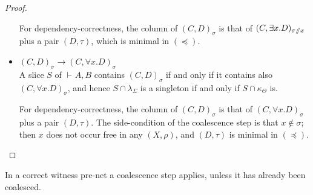\documentclass[UKenglish]{lipics-v2016}
\theoremstyle{plain}
\newcommand\+{+}
\renewcommand\*{\times}
\newcommand\dep{\preccurlyeq}
\newcommand\seq[3][]{{\vdash_{#1}}#2,#3}
\newcommand\minus{\mathop{\!/\mathchoice{\kern-3pt}{\kern-3pt}{\kern-2.5pt}{\kern-2pt}/\!}}
\newcommand\link[3][\sigma]{(#2,#3)_{#1}}
\newcommand\scoal{\rightarrow} %
\begin{document}
\begin{proof}
\begin{itemize}
For dependency-correctness, the column of $\link CD$ is that of $\link[\sigma\minus x]C{\exists x.D}$ plus a pair $(D,\tau)$, which is minimal in $(\dep)$.

	\item
$\link CD\scoal\link C{\forall x.D}$
\\
A slice $S$ of $\seq AB$ contains $\link CD$ if and only if it contains also $\link C{\forall x.D}$, and hence $S\cap\lambda_\Sigma$ is a singleton if and only if $S\cap\kappa_\Theta$ is.

For dependency-correctness, the column of $\link CD$ is that of $\link C{\forall x.D}$ plus a pair $(D,\tau)$. The side-condition of the coalescence step is that $x\notin\sigma$; then $x$ does not occur free in any $(X,\rho)$, and $(D,\tau)$ is minimal in $(\dep)$.
\qedhere
\end{itemize}
\end{proof}


\setcounter{theorem}{\thelemcoalescenceapplies}
\begin{lemma}[Restatement]
In a correct witness pre-net a coalescence step applies, unless it has already been coalesced.
\end{lemma}
\end{document}
